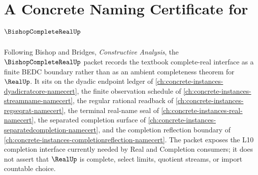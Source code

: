 \chapter{A Concrete Naming Certificate for $\BishopCompleteRealUp$}
\label{ch:concrete-instances-bishop-complete-real-namecert}

Following Bishop and Bridges, \emph{Constructive Analysis}, the $\BishopCompleteRealUp$ packet records the textbook complete-real interface as a finite BEDC boundary rather than as an ambient completeness theorem for $\RealUp$. It sits on the dyadic endpoint ledger of \autoref{ch:concrete-instances-dyadicratcore-namecert}, the finite observation schedule of \autoref{ch:concrete-instances-streamname-namecert}, the regular rational readback of \autoref{ch:concrete-instances-regseqrat-namecert}, the terminal real-name seal of \autoref{ch:concrete-instances-real-namecert}, the separated completion surface of \autoref{ch:concrete-instances-separatedcompletion-namecert}, and the completion reflection boundary of \autoref{ch:concrete-instances-completionreflection-namecert}. The packet exposes the L10 completion interface currently needed by Real and Completion consumers; it does not assert that $\RealUp$ is complete, select limits, quotient streams, or import countable choice.

